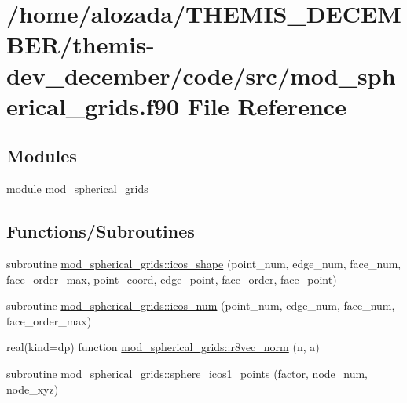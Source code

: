 \hypertarget{mod__spherical__grids_8f90}{}\section{/home/alozada/\+T\+H\+E\+M\+I\+S\+\_\+\+D\+E\+C\+E\+M\+B\+E\+R/themis-\/dev\+\_\+december/code/src/mod\+\_\+spherical\+\_\+grids.f90 File Reference}
\label{mod__spherical__grids_8f90}
\subsection*{Modules}
\begin{DoxyCompactItemize}
\item 
module \hyperlink{namespacemod__spherical__grids}{mod\+\_\+spherical\+\_\+grids}
\end{DoxyCompactItemize}
\subsection*{Functions/\+Subroutines}
\begin{DoxyCompactItemize}
\item 
subroutine \hyperlink{namespacemod__spherical__grids_ac770a39945e60a262069f9f186819614}{mod\+\_\+spherical\+\_\+grids\+::icos\+\_\+shape} (point\+\_\+num, edge\+\_\+num, face\+\_\+num, face\+\_\+order\+\_\+max, point\+\_\+coord, edge\+\_\+point, face\+\_\+order, face\+\_\+point)
\item 
subroutine \hyperlink{namespacemod__spherical__grids_a98d8c41d6d666f6c3fe1dbadcf0dba89}{mod\+\_\+spherical\+\_\+grids\+::icos\+\_\+num} (point\+\_\+num, edge\+\_\+num, face\+\_\+num, face\+\_\+order\+\_\+max)
\item 
real(kind=dp) function \hyperlink{namespacemod__spherical__grids_adbe3eff686f6254a50a5afd75255c2c8}{mod\+\_\+spherical\+\_\+grids\+::r8vec\+\_\+norm} (n, a)
\item 
subroutine \hyperlink{namespacemod__spherical__grids_a58af853045eb54cbf3a8515e0f48b23b}{mod\+\_\+spherical\+\_\+grids\+::sphere\+\_\+icos1\+\_\+points} (factor, node\+\_\+num, node\+\_\+xyz)
\end{DoxyCompactItemize}
